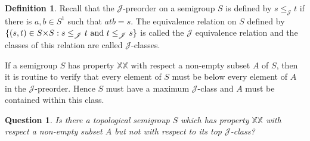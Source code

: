 \documentclass[11pt]{amsart}
\newtheorem{question}[theorem]{Question}
\theoremstyle{definition}
\newtheorem{definition}[theorem]{Definition}
\begin{document}
\begin{definition}
    Recall that the \(\mathscr{J}\)-preorder on a semigroup \(S\) is defined by \(s\leq_\mathscr{J} t\) if there is \(a,b\in S^1\) such that \(atb=s\). The equivalence relation on \(S\) defined by $\{(s,t)\in S{\times}S: s\leq_{\mathscr{J}}t \hbox{ and } t\leq_{\mathscr{J}}s\}$ is called the \(\mathscr{J}\) equivalence relation and the classes of this relation are called \(\mathscr{J}\)-classes.
\end{definition}

    If a semigroup \(S\) has property $\mathbb{XX}$ with respect a non-empty subset \(A\) of \(S\), then it is routine to verify that every element of \(S\) must be below every element of \(A\) in the \(\mathscr{J}\)-preorder. 
    Hence \(S\) must have a maximum \(\mathscr{J}\)-class and \(A\) must be contained within this class. 
\begin{question}
    Is there a topological semigroup \(S\) which has property $\mathbb{XX}$ with respect a non-empty subset \(A\) but not with respect to its top \(\mathscr{J}\)-class?
\end{question}
\end{document}
